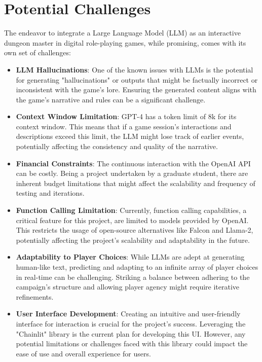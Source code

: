 \documentclass[12pt]{article}
\begin{document}
\section{Potential Challenges}

The endeavor to integrate a Large Language Model (LLM) as an interactive dungeon master in digital role-playing games, while promising, comes with its own set of challenges:

\begin{itemize}
\item \textbf{LLM Hallucinations}: One of the known issues with LLMs is the potential for generating "hallucinations" or outputs that might be factually incorrect or inconsistent with the game's lore. Ensuring the generated content aligns with the game's narrative and rules can be a significant challenge.
\item \textbf{Context Window Limitation}: GPT-4 has a token limit of 8k for its context window. This means that if a game session's interactions and descriptions exceed this limit, the LLM might lose track of earlier events, potentially affecting the consistency and quality of the narrative.
\item \textbf{Financial Constraints}: The continuous interaction with the OpenAI API can be costly. Being a project undertaken by a graduate student, there are inherent budget limitations that might affect the scalability and frequency of testing and iterations.
\item \textbf{Function Calling Limitation}: Currently, function calling capabilities, a critical feature for this project, are limited to models provided by OpenAI. This restricts the usage of open-source alternatives like Falcon and Llama-2, potentially affecting the project's scalability and adaptability in the future.
\item \textbf{Adaptability to Player Choices}: While LLMs are adept at generating human-like text, predicting and adapting to an infinite array of player choices in real-time can be challenging. Striking a balance between adhering to the campaign's structure and allowing player agency might require iterative refinements.
\item \textbf{User Interface Development}: Creating an intuitive and user-friendly interface for interaction is crucial for the project's success. Leveraging the "Chainlit" library is the current plan for developing this UI. However, any potential limitations or challenges faced with this library could impact the ease of use and overall experience for users.
\end{itemize}
\end{document}
